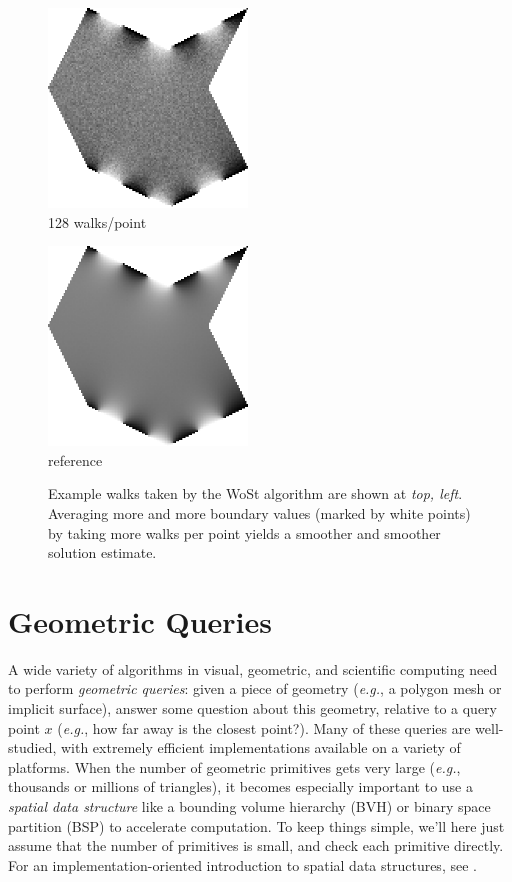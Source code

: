 \documentclass{article}
\newcommand{\figlabel}[1]{\textsf{#1}}
\newcommand{\figloc}[1]{\textit{#1}}
\newcommand{\eg}{\emph{e.g.}} %
\begin{document}
\begin{figure}[h!]
   \vspace{\baselineskip}

   \begin{minipage}{150pt}
      \centering
      \includegraphics[width=150pt]{images/WoSt-128wpp.png} \\
      \figlabel{128 walks/point}
   \end{minipage}
   \begin{minipage}{150pt}
      \centering
      \includegraphics[width=150pt]{images/WoSt-65536wpp.png} \\
      \figlabel{reference}
   \end{minipage}
   \caption{Example walks taken by the WoSt algorithm are shown at \figloc{top, left}.  Averaging more and more boundary values (marked by white points) by taking more walks per point yields a smoother and smoother solution estimate.\label{fig:WoSExample}}
\end{figure}

\newpage

\section{Geometric Queries}
\label{sec:GeometricQueries}

A wide variety of algorithms in visual, geometric, and scientific computing need to perform \emph{geometric queries}: given a piece of geometry (\eg{}, a polygon mesh or implicit surface), answer some question about this geometry, relative to a query point \(x\) (\eg{}, how far away is the closest point?).  Many of these queries are well-studied, with extremely efficient implementations available on a variety of platforms.  When the number of geometric primitives gets very large (\eg{}, thousands or millions of triangles), it becomes especially important to use a \emph{spatial data structure} like a bounding volume hierarchy (BVH) or binary space partition (BSP) to accelerate computation.  To keep things simple, we'll here just assume that the number of primitives is small, and check each primitive directly.  For an implementation-oriented introduction to spatial data structures, see \citet[Section 4.2]{pharr2016physically}.
\end{document}
